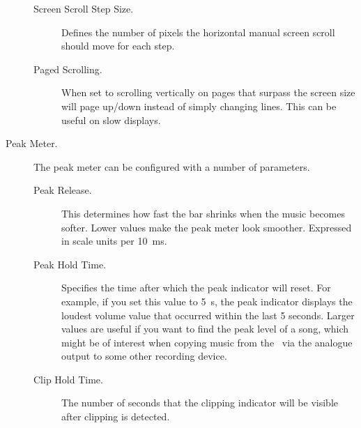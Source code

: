 \begin{description}
\begin{description}
    \item[Screen Scroll Step Size.]
      Defines the number of pixels the horizontal manual screen scroll should move
      for each step.
    \item[Paged Scrolling.]
      When set to  scrolling vertically on pages that surpass the
      screen size will page up/down instead of simply changing lines. This can be
      useful on slow displays.
    \end{description}
%
  \item[Peak Meter.]
    The peak meter can be configured with a number of parameters.
    \begin{description}
    \item[Peak Release.]
      This determines how fast the bar shrinks when the music becomes
      softer. Lower values make the peak meter look smoother.
      Expressed in scale units per 10~ms.
    \item[Peak Hold Time.]
      Specifies the time after which the peak indicator will reset.
      For example, if you set this value to 5~s, the peak indicator displays
      the loudest volume value that occurred within the last 5 seconds.
      Larger values are useful if you want to find the peak level of a song,
      which might be of interest when copying music from the \dap\ via the
      analogue output to some other recording device.
    \item[Clip Hold Time.]
      The number of seconds that the clipping indicator will be visible
      after clipping is detected.
\end{description}
\end{description}
